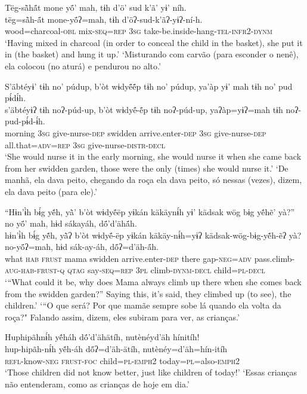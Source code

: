 \documentclass[output=paper,
modfonts,nonflat
]{langsci/langscibook}
\begin{document}
\ea  Tëg-sä̀hä́t mone yö́’ mah, tɨh d’ö’ sud k’ã’ yɨ’ níh.\\
\gll tëg=sä̀h-ä́t mone-yö́ʔ=mah, tɨh d’öʔ-sud-k’ãʔ-yɨʔ-ní-h.\\
     wood=charcoal\textsc{-obl} mix\textsc{-seq=rep} \textsc{3sg} take-be.inside-hang\textsc{-tel-infr2-dynm}\\
\glt ‘Having mixed in charcoal (in order to conceal the child in the basket), she put it in (the basket) and hung it up.'
\glt ‘Misturando com carvão (para esconder o nenê), ela colocou (no aturá) e pendurou no alto.'
\z 

\ea  S’äbtéyɨ’ tɨh no’ púdup, b’òt wɨdyë́ë́p tɨh no’ púdup, ya’àp yɨ’ mah tɨh no’ pud pɨ́dɨ́h.\\
\gll s’äbtéyɨʔ tɨh noʔ-púd-up, b’òt wɨdyë́-ë́p tɨh noʔ-púd-up, yaʔàp=yɨʔ=mah tɨh noʔ-pud-pɨ́d-ɨ́h.\\
     morning \textsc{3sg} give-nurse\textsc{-dep} swidden arrive.enter\textsc{-dep} \textsc{3sg} give-nurse\textsc{-dep} all.that\textsc{=adv=rep} \textsc{3sg} give-nurse\textsc{-distr-decl}\\
\glt ‘She would nurse it in the early morning, she would nurse it when she came back from her swidden garden, those were the only (times) she would nurse it.'
\glt ‘De manhã, ela dava peito, chegando da roça ela dava peito, só nessas (vezes), dizem, ela dava peito (para ele).'
\z 

\newpage
\ea  “Hɨn’ɨ̀h bɨ́g yẽ́h, yã̀’ b’òt wɨdyë́ëp yɨkán käkäynɨ́h yɨ’ kädsak wög bɨg yẽ́hẽ’ yà?” no yö́’ mah, hɨd sákayáh, dö́’d’ähä́h.\\
\gll hɨn’ɨ̀h bɨ́g yẽ́h, yã̀ʔ b’òt wɨdyë́-ëp yɨkán käkäy-nɨ́h=yɨʔ kädsak-wög-bɨg-yẽ́h-ẽʔ yà? no-yö́ʔ=mah, hɨd sák-ay-áh, dö́ʔ=d’äh-ä́h.\\
     what \textsc{hab} \textsc{frust} mama swidden arrive.enter\textsc{-dep} there gap\textsc{-neg=adv} pass.climb\textsc{-aug-hab-frust-q} \textsc{qtag} say\textsc{-seq=rep} \textsc{3pl} climb\textsc{-dynm-decl} child\textsc{=pl-decl}\\
\glt ‘“What could it be, why does Mama always climb up there when she comes back from the swidden garden?” Saying this, it’s said, they climbed up (to see), the children.'
\glt ‘“O que será? Por que mamãe sempre sobe lá quando ela volta da roça?" Falando assim, dizem, eles subiram para ver, as crianças.'
\z 

\ea  Huphipãhnɨ́h yẽ́háh dö́’d’ähätíh, nutènéyd’äh hínitíh!\\
\gll hup-hipãh-nɨ́h yẽ́h-áh dö́ʔ=d’äh-ätíh, nutènéy=d’äh=hín-itíh\\
     \textsc{refl-}know\textsc{-neg} \textsc{frust-foc} child\textsc{=pl-emph2} today\textsc{=pl}=also-\textsc{emph2}\\
\glt ‘Those children did not know better,{\footnotemark} just like children of today!'
\glt ‘Essas crianças não entenderam, como as crianças de hoje em dia.'
\z 
\end{document}
